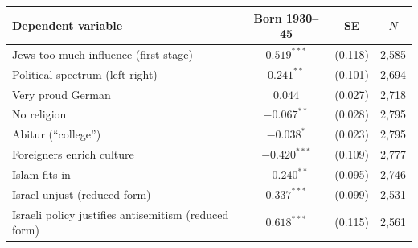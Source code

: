 \begin{tabular}{lccc}
\toprule
Dependent variable & Born 1930--45 & SE & $N$ \\
\midrule
Jews too much influence (first stage) & $0.519^{***}$ & (0.118) & 2,585 \\
Political spectrum (left-right) & $0.241^{**}$ & (0.101) & 2,694 \\
Very proud German & $0.044$ & (0.027) & 2,718 \\
No religion & $-0.067^{**}$ & (0.028) & 2,795 \\
Abitur (``college'') & $-0.038^{*}$ & (0.023) & 2,795 \\
Foreigners enrich culture & $-0.420^{***}$ & (0.109) & 2,777 \\
Islam fits in & $-0.240^{**}$ & (0.095) & 2,746 \\
Israel unjust (reduced form) & $0.337^{***}$ & (0.099) & 2,531 \\
Israeli policy justifies antisemitism (reduced form) & $0.618^{***}$ & (0.115) & 2,561 \\
\bottomrule
\end{tabular}

